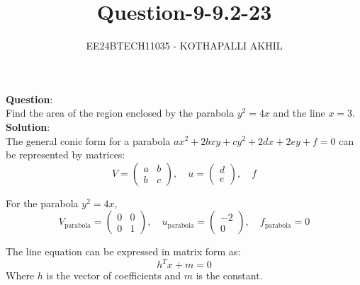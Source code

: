 \documentclass[journal]{IEEEtran}
\begin{document}

\title{Question-9-9.2-23}
\author{EE24BTECH11035 - KOTHAPALLI AKHIL}
{\let\newpage\relax\maketitle}
\vspace{-10mm}
\textbf{Question}:\\
Find the area of the region enclosed by the parabola $y^2 = 4x$ and the line $x = 3$.\\
\textbf{Solution}:\\

The general conic form for a parabola $ax^2 + 2bxy + cy^2 + 2dx + 2ey + f = 0$ can be represented by matrices:
\begin{equation}
V = \begin{pmatrix} a & b \\ b & c \end{pmatrix}, \quad u = \begin{pmatrix} d \\ e \end{pmatrix}, \quad f
\end{equation}

For the parabola $y^2 = 4x$,
\begin{equation}
V_{\text{parabola}} = \begin{pmatrix} 0 & 0 \\ 0 & 1 \end{pmatrix}, \quad u_{\text{parabola}} = \begin{pmatrix} -2 \\ 0 \end{pmatrix}, \quad f_{\text{parabola}} = 0
\end{equation}

The line equation can be expressed in matrix form as:
\begin{equation}
h^T x + m = 0
\end{equation}
Where $h$ is the vector of coefficients and $m$ is the constant.
\end{document}
